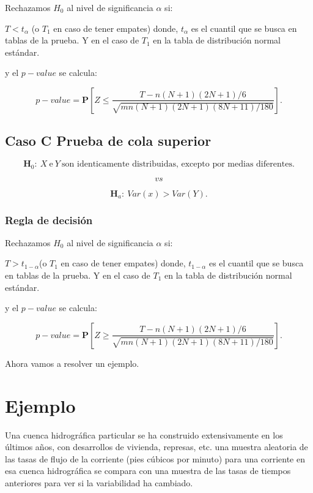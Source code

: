 \documentclass[
  a4paper,
  oneside,
  openany]{book}
\begin{document}
Rechazamos \(H_0\) al nivel de significancia \(\alpha\) si:

\(T<t_\alpha\) (o \(T_1\) en caso de tener empates) donde, \(t_\alpha\) es el cuantil que se busca en tablas de la prueba. Y en el caso de \(T_{1}\) en la tabla de distribución normal estándar.

y el \(p-value\) se calcula:

\[ p-value= \mathbf{P}\left[Z\leq\frac{T-n(N+1)(2N+1)/6}{\sqrt{mn(N+1)(2N+1)(8N+11)/180}}\right].\]

\hypertarget{caso-c-prueba-de-cola-superior-5}{%
\subsection*{Caso C Prueba de cola superior}\label{caso-c-prueba-de-cola-superior-5}}


\[\textbf{H}_0: \ X \  \mbox{e} \  Y \ \mbox{son identicamente distribuidas, excepto por medias diferentes.}\]

\[vs\]

\[\textbf{H}_a: \ Var(x) > Var(Y).\]

\hypertarget{regla-de-decisiuxf3n-19}{%
\subsubsection*{Regla de decisión}\label{regla-de-decisiuxf3n-19}}


Rechazamos \(H_0\) al nivel de significancia \(\alpha\) si:

\(T>t_{1-\alpha}\)(o \(T_1\) en caso de tener empates) donde, \(t_{1-\alpha}\) es el cuantil que se busca en tablas de la prueba. Y en el caso de \(T_{1}\) en la tabla de distribución normal estándar.

y el \(p-value\) se calcula:

\[p-value=\mathbf{P}\left[Z\geq\frac{T-n(N+1)(2N+1)/6}{\sqrt{mn(N+1)(2N+1)(8N+11)/180}}\right].\]

Ahora vamos a resolver un ejemplo.

\hypertarget{ejemplo-8}{%
\section{Ejemplo}\label{ejemplo-8}}

Una cuenca hidrográfica particular se ha construido extensivamente en los últimos años, con desarrollos de vivienda, represas, etc. una muestra aleatoria de las tasas de flujo de la corriente (pies cúbicos por minuto) para una corriente en esa cuenca hidrográfica se compara con una muestra de las tasas de tiempos anteriores para ver si la variabilidad ha cambiado.
\end{document}
